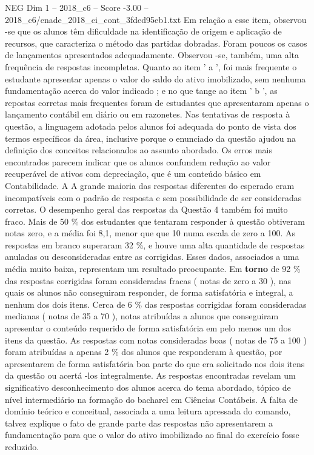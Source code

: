 \begin{textsample}{NEG Dim 1 – 2018\_c6 – Score -3.00 – 2018\_c6/enade\_2018\_ci\_cont\_3fded95eb1.txt}
Em relação a esse item, observou -se que os alunos têm dificuldade na identificação de origem e aplicação de recursos, que caracteriza o método das partidas dobradas.
Foram poucos os casos de lançamentos apresentados adequadamente.
Observou -se, também, uma alta frequência de respostas incompletas.
Quanto ao item ' a ', foi mais frequente o estudante apresentar apenas o valor do saldo do ativo imobilizado, sem nenhuma fundamentação acerca do valor indicado ; e no que tange ao item ' b ', as repostas corretas mais frequentes foram de estudantes que apresentaram apenas o lançamento contábil em diário ou em razonetes.
Nas tentativas de resposta à questão, a linguagem adotada pelos alunos foi adequada do ponto de vista dos termos específicos da área, inclusive porque o enunciado da questão ajudou na definição dos conceitos relacionados ao assunto abordado.
Os erros mais encontrados parecem indicar que os alunos confundem redução ao valor recuperável de ativos com depreciação, que é um conteúdo básico em Contabilidade.
A A grande maioria das respostas diferentes do esperado eram incompatíveis com o padrão de resposta e sem possibilidade de ser consideradas corretas.
O desempenho geral das respostas da Questão 4 também foi muito fraco.
Mais de 50 \% dos estudantes que tentaram responder à questão obtiveram notas zero, e a média foi 8,1, menor que que 10 numa escala de zero a 100.
As respostas em branco superaram 32 \%, e houve uma alta quantidade de respostas anuladas ou desconsideradas entre as corrigidas.
Esses dados, associados a uma média muito baixa, representam um resultado preocupante.
Em \textbf{torno} de 92 \% das respostas corrigidas foram consideradas fracas ( notas de zero a 30 ), nas quais os alunos não conseguiram responder, de forma satisfatória e integral, a nenhum dos dois itens.
Cerca de 6 \% das respostas corrigidas foram consideradas medianas ( notas de 35 a 70 ), notas atribuídas a alunos que conseguiram apresentar o conteúdo requerido de forma satisfatória em pelo menos um dos itens da questão.
As respostas com notas consideradas boas ( notas de 75 a 100 ) foram atribuídas a apenas 2 \% dos alunos que responderam à questão, por apresentarem de forma satisfatória boa parte do que era solicitado nos dois itens da questão ou acertá -los integralmente.
As respostas encontradas revelam um significativo desconhecimento dos alunos acerca do tema abordado, tópico de nível intermediário na formação do bacharel em Ciências Contábeis.
A falta de domínio teórico e conceitual, associada a uma leitura apressada do comando, talvez explique o fato de grande parte das respostas não apresentarem a fundamentação para que o valor do ativo imobilizado ao final do exercício fosse reduzido.

\end{textsample}
